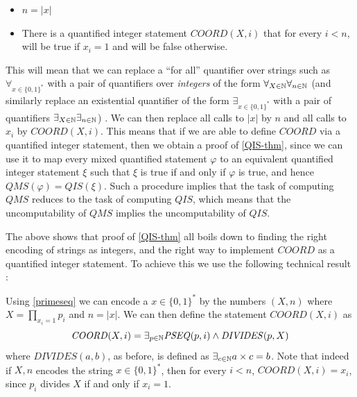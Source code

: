 \begin{itemize}
\item
  \(n=|x|\)
\item
  There is a quantified integer statement
  \(\ensuremath{\mathit{COORD}}(X,i)\) that for every \(i<n\), will be
  true if \(x_i=1\) and will be false otherwise.
\end{itemize}

This will mean that we can replace a ``for all'' quantifier over strings
such as \(\forall_{x\in \{0,1\}^*}\) with a pair of quantifiers over
\emph{integers} of the form \(\forall_{X\in {\mathbb{N}}}\forall_{n\in{\mathbb{N}}}\) (and
similarly replace an existential quantifier of the form
\(\exists_{x\in \{0,1\}^*}\) with a pair of quantifiers
\(\exists_{X\in {\mathbb{N}}}\exists_{n\in{\mathbb{N}}}\)) . We can then replace all calls
to \(|x|\) by \(n\) and all calls to \(x_i\) by
\(\ensuremath{\mathit{COORD}}(X,i)\). This means that if we are able to
define \(\ensuremath{\mathit{COORD}}\) via a quantified integer
statement, then we obtain a proof of \cref{QIS-thm}, since we can use it
to map every mixed quantified statement \(\varphi\) to an equivalent
quantified integer statement \(\xi\) such that \(\xi\) is true if and
only if \(\varphi\) is true, and hence
\(\ensuremath{\mathit{QMS}}(\varphi)=\ensuremath{\mathit{QIS}}(\xi)\).
Such a procedure implies that the task of computing
\(\ensuremath{\mathit{QMS}}\) reduces to the task of computing
\(\ensuremath{\mathit{QIS}}\), which means that the uncomputability of
\(\ensuremath{\mathit{QMS}}\) implies the uncomputability of
\(\ensuremath{\mathit{QIS}}\).

The above shows that proof of \cref{QIS-thm} all boils down to finding
the right encoding of strings as integers, and the right way to
implement \(\ensuremath{\mathit{COORD}}\) as a quantified integer
statement. To achieve this we use the following technical result :

\hypertarget{primeseq}{}

Using \cref{primeseq} we can encode a \(x\in\{0,1\}^*\) by the numbers
\((X,n)\) where \(X = \prod_{x_i=1} p_i\) and \(n=|x|\). We can then
define the statement \(\ensuremath{\mathit{COORD}}(X,i)\) as \[
\mathit{COORD}(X,i) = \exists_{p\in{\mathbb{N}}}  \mathit{PSEQ}(p,i) \wedge \mathit{DIVIDES}(p,X) 
\] where \(\ensuremath{\mathit{DIVIDES}}(a,b)\), as before, is defined
as \(\exists_{c\in{\mathbb{N}}} a\times c = b\). Note that indeed if \(X,n\)
encodes the string \(x\in \{0,1\}^*\), then for every \(i<n\),
\(\ensuremath{\mathit{COORD}}(X,i)=x_i\), since \(p_i\) divides \(X\) if
and only if \(x_i=1\).

